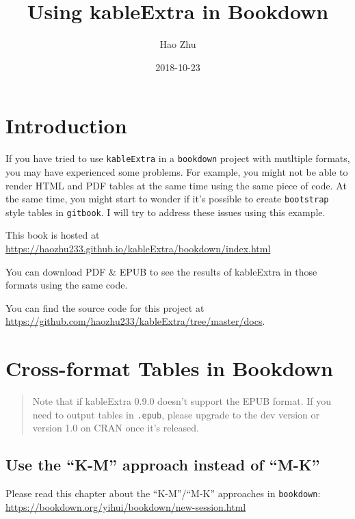\documentclass[]{book}
\title{Using kableExtra in Bookdown}
\author{Hao Zhu}
\date{2018-10-23}
\begin{document}
\maketitle

{
\setcounter{tocdepth}{1}
\tableofcontents
}
\hypertarget{introduction}{%
\chapter{Introduction}\label{introduction}}

If you have tried to use \texttt{kableExtra} in a \texttt{bookdown}
project with mutltiple formats, you may have experienced some problems.
For example, you might not be able to render HTML and PDF tables at the
same time using the same piece of code. At the same time, you might
start to wonder if it's possible to create \texttt{bootstrap} style
tables in \texttt{gitbook}. I will try to address these issues using
this example.

This book is hosted at
\url{https://haozhu233.github.io/kableExtra/bookdown/index.html}

You can download PDF \& EPUB to see the results of kableExtra in those
formats using the same code.

You can find the source code for this project at
\url{https://github.com/haozhu233/kableExtra/tree/master/docs}.

\hypertarget{cross-format-tables-in-bookdown}{%
\chapter{Cross-format Tables in
Bookdown}\label{cross-format-tables-in-bookdown}}

\begin{quote}
Note that if kableExtra 0.9.0 doesn't support the EPUB format. If you
need to output tables in \texttt{.epub}, please upgrade to the dev
version or version 1.0 on CRAN once it's released.
\end{quote}

\hypertarget{use-the-k-m-approach-instead-of-m-k}{%
\section{Use the ``K-M'' approach instead of
``M-K''}\label{use-the-k-m-approach-instead-of-m-k}}

Please read this chapter about the ``K-M''/``M-K'' approaches in
\texttt{bookdown}:
\url{https://bookdown.org/yihui/bookdown/new-session.html}
\end{document}
